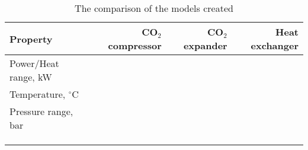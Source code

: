\begin{table}
\label{tab:DiscussionComparison}
\caption{The comparison of the models created}
\begin{center}
\begin{tabulary}{0.9\textwidth}{LRRR}
\toprule
Property 	&	CO$_2$ compressor & CO$_2$	expander & Heat exchanger \\
\midrule
Power/Heat range, kW& & & \\
Temperature, $^\circ$C& & & \\
Pressure range, bar& & & \\
& & & \\
& & & \\
& & & \\
\bottomrule
\end{tabulary}
\end{center}
\end{table}